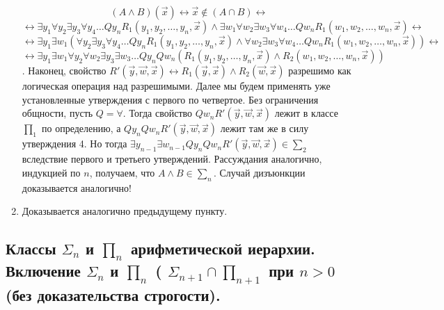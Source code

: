 \documentclass[a4paper, 10pt]{article}
\begin{document}
\begin{enumerate}
{		$$(A \land B)(\vec{x}) \leftrightarrow \vec{x} \notin (A \cap B)\leftrightarrow $$
		$$\leftrightarrow \exists y_1 \forall y_2 \exists y_3 \forall y_4 \ldots Q y_n R_1 (y_1, y_2, \ldots, y_n, \vec{x}) \land \exists w_1 \forall w_2 \exists w_3 \forall w_4 \ldots Q w_n R_1 (w_1, w_2, \ldots, w_n, \vec{x}) \leftrightarrow $$
		$$\leftrightarrow   \exists y_1 \exists w_1 (\forall y_2 \exists y_3 \forall y_4 \ldots Q y_n R_1 (y_1, y_2, \ldots, y_n, \vec{x}) \land \forall w_2 \exists w_3 \forall w_4 \ldots Q w_n R_1 (w_1, w_2, \ldots, w_n, \vec{x})) \leftrightarrow $$
		$$\leftrightarrow \exists y_1 \exists w_1 \forall y_2 \forall w_2 \exists y_3 \exists w_3 \ldots Q y_n Q w_n (R_1(y_1, y_2, \ldots, y_n, \vec{x}) \land R_2(w_1, w_2, \ldots, w_n, \vec{x}))$$.
		Наконец, свойство $R' (\vec{y}, \vec{w}, \vec{x}) \leftrightarrow R_1(\vec{y}, \vec{x}) \land R_2(\vec{w}, \vec{x})$ разрешимо как логическая операция над разрешимыми. Далее мы будем применять уже установленные утверждения с первого по четвертое. Без ограничения общности, пусть $Q = \forall$. Тогда свойство $Q w_n R' (\vec{y}, \vec{w}, \vec{x})$ лежит в классе $\prod_1$ по определению, а $Q y_n Q w_n R' (\vec{y}, \vec{w}, \vec{x})$ лежит там же в силу утверждения 4. Но тогда $\exists y_{n-1} \exists w_{n-1} Q y_n Q w_n R'(\vec{y}, \vec{w}, \vec{x}) \in \sum_2$ вследствие первого и третьего утверждений. Рассуждания аналогично, индукцией по $n$, получаем, что $A \land B \in \sum_n$.
		Случай дизъюнкции доказывается аналогично!
	}
	\item{Доказывается аналогично предыдущему пункту}.
\end{enumerate}

\subsection{Классы $\Sigma_n$ и $\prod_n$ арифметической иерархии. Включение $\Sigma_n$ и $\prod_n$ ( $\Sigma_{n+1} \cap \prod_{n+1}$ при $n > 0$ (без доказательства строгости).}
\end{document}
